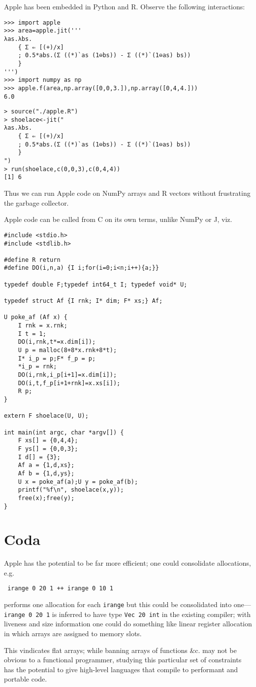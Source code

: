 \documentclass[sigplan,screen]{acmart}
\begin{document}
Apple has been embedded in Python and R. Observe the following interactions:

\begin{verbatim}
>>> import apple
>>> area=apple.jit('''
λas.λbs.
    { Σ ⇐ [(+)/x]
    ; 0.5*abs.(Σ ((*)`as (1⊖bs)) - Σ ((*)`(1⊖as) bs))
    }
''')
>>> import numpy as np
>>> apple.f(area,np.array([0,0,3.]),np.array([0,4,4.]))
6.0
\end{verbatim}

\begin{verbatim}
> source("./apple.R")
> shoelace<-jit("
λas.λbs.
    { Σ ⇐ [(+)/x]
    ; 0.5*abs.(Σ ((*)`as (1⊖bs)) - Σ ((*)`(1⊖as) bs))
    }
")
> run(shoelace,c(0,0,3),c(0,4,4))
[1] 6
\end{verbatim}

Thus we can run Apple code on NumPy arrays and R vectors without frustrating the garbage collector.

Apple code can be called from C on its own terms, unlike NumPy or J, viz.

\begin{verbatim}
#include <stdio.h>
#include <stdlib.h>

#define R return
#define DO(i,n,a) {I i;for(i=0;i<n;i++){a;}}

typedef double F;typedef int64_t I; typedef void* U;

typedef struct Af {I rnk; I* dim; F* xs;} Af;

U poke_af (Af x) {
    I rnk = x.rnk;
    I t = 1;
    DO(i,rnk,t*=x.dim[i]);
    U p = malloc(8+8*x.rnk+8*t);
    I* i_p = p;F* f_p = p;
    *i_p = rnk;
    DO(i,rnk,i_p[i+1]=x.dim[i]);
    DO(i,t,f_p[i+1+rnk]=x.xs[i]);
    R p;
}

extern F shoelace(U, U);

int main(int argc, char *argv[]) {
    F xs[] = {0,4,4};
    F ys[] = {0,0,3};
    I d[] = {3};
    Af a = {1,d,xs};
    Af b = {1,d,ys};
    U x = poke_af(a);U y = poke_af(b);
    printf("%f\n", shoelace(x,y));
    free(x);free(y);
}
\end{verbatim}

\section{Coda}

Apple has the potential to be far more efficient; one could consolidate allocations, e.g.

\begin{verbatim}
 irange 0 20 1 ++ irange 0 10 1
\end{verbatim}
performs one allocation for each {\tt irange} but this could be consolidated into one---{\tt irange 0 20 1} is inferred to have type {\tt Vec 20 int} in the existing compiler; with liveness and size information one could do something like linear register allocation in which arrays are assigned to memory slots.

This vindicates flat arrays; while banning arrays of functions \&c. may not be obvious to a functional programmer, studying this particular set of constraints has the potential to give high-level languages that compile to performant and portable code.



\end{document}
